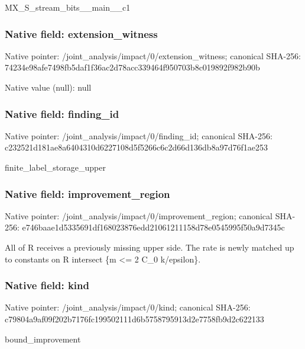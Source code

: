 \documentclass[10pt,a4paper]{article}
\begin{document}
\begingroup\raggedright\sloppy MX\_\allowbreak{}S\_\allowbreak{}stream\_\allowbreak{}bits\_\allowbreak{}\_\allowbreak{}main\_\allowbreak{}\_\allowbreak{}c1\par\endgroup

\subsubsection{Native field: extension\_\allowbreak{}witness}
Native pointer: /joint\_\allowbreak{}analysis/impact/0/extension\_\allowbreak{}witness; canonical SHA-256: 74234e98afe7498fb5daf1f36ac2d78acc339464f950703b8c019892f982b90b

Native value (null): null

\subsubsection{Native field: finding\_\allowbreak{}id}
Native pointer: /joint\_\allowbreak{}analysis/impact/0/finding\_\allowbreak{}id; canonical SHA-256: c232521d181ae8a6404310d6227108d5f5266c6c2d66d136db8a97d76f1ae253

\begingroup\raggedright\sloppy finite\_\allowbreak{}label\_\allowbreak{}storage\_\allowbreak{}upper\par\endgroup

\subsubsection{Native field: improvement\_\allowbreak{}region}
Native pointer: /joint\_\allowbreak{}analysis/impact/0/improvement\_\allowbreak{}region; canonical SHA-256: e746baae1d5335691df168023876edd21061211158d78e0545995f50a9d7345c

\begingroup\raggedright\sloppy All of R receives a previously missing upper side. The rate is newly matched up to constants on R intersect \{m <=\allowbreak{} 2 C\_\allowbreak{}0 k/\allowbreak{}epsilon\}.\par\endgroup

\subsubsection{Native field: kind}
Native pointer: /joint\_\allowbreak{}analysis/impact/0/kind; canonical SHA-256: c79804a9af09f202b7176fc199502111d6b5758795913d2e7758fb9d2c622133

\begingroup\raggedright\sloppy bound\_\allowbreak{}improvement\par\endgroup
\end{document}
